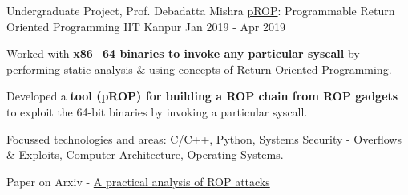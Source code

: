 \begin{cventries}


  \cventry
    {Undergraduate Project, Prof. Debadatta Mishra} %
    {\href{https://arxiv.org/abs/2111.03537}{pROP}: Programmable Return Oriented Programming} %
    {IIT Kanpur} %
    {Jan 2019 - Apr 2019} %
    {
      \begin{cvitems} %
      \item {Worked with \textbf{x86\_64 binaries to invoke any particular syscall} by performing static analysis \& using concepts of Return Oriented Programming.}
      \item {Developed a \textbf{tool (pROP) for building a ROP chain from ROP gadgets} to exploit the 64-bit binaries by invoking a particular syscall.}
      \item {Focussed technologies and areas: C/C++, Python, Systems Security - Overflows \& Exploits, Computer Architecture, Operating Systems.}
      \item {Paper on Arxiv - \href{https://arxiv.org/abs/2111.03537}{A practical analysis of ROP attacks}}
      \end{cvitems}
    }






\end{cventries}
